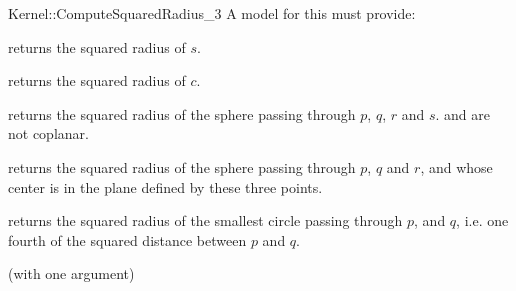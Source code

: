 \begin{ccRefFunctionObjectConcept}{Kernel::ComputeSquaredRadius_3}
A model for this must provide:


       {returns the squared radius of $s$. }

       {returns the squared radius of $c$. }

       {returns the squared radius of the sphere passing through $p$, $q$, $r$
       and $s$. \ccPrecond {} and  are not coplanar.}

       {returns the squared radius of the sphere passing through $p$, $q$ and
       $r$, and whose center is in the plane defined by these three points.}

{returns the squared radius of the smallest circle passing through $p$,
and $q$, i.e. one fourth of the squared distance between $p$ and $q$.}

\ccRefines
{} (with one argument)

\ccSeeAlso
{}\\
\\
 \\

\end{ccRefFunctionObjectConcept}
